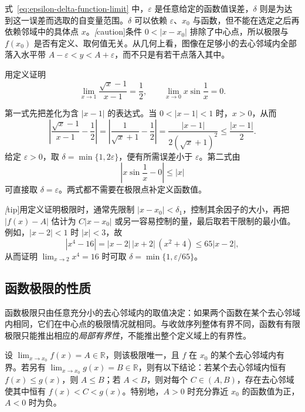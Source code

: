 \documentclass[UTF8,12pt,a4paper,fontset=fandol]{ctexbook}
\begin{document}
式~\eqref{eq:epsilon-delta-function-limit} 中，$\varepsilon$ 是任意给定的函数值误差，$\delta$ 则是为达到这一误差而选取的自变量范围。$\delta$ 可以依赖 $\varepsilon$、$x_0$ 与函数，但不能在选定之后再依赖邻域中的具体点 $x$。\emph[caution]{条件 $0<|x-x_0|$ 排除了中心点，所以极限与 $f(x_0)$ 是否有定义、取何值无关。}从几何上看，图像在足够小的去心邻域内全部落入水平带 $A-\varepsilon<y<A+\varepsilon$，而不只是有若干点落入其中。

\begin{example}
\label{ex:epsilon-delta-function-limits}
用定义证明
\[
    \lim_{x\to1}\frac{\sqrt{x}-1}{x-1}=\frac12,
    \qquad
    \lim_{x\to0}x\sin\frac1x=0.
\]
\end{example}

\begin{solve}
第一式先把差化为含 $|x-1|$ 的表达式。当 $0<|x-1|<1$ 时，$x>0$，从而
\[
    \left|\frac{\sqrt{x}-1}{x-1}-\frac12\right|
    =\left|\frac1{\sqrt{x}+1}-\frac12\right|
    =\frac{|x-1|}{2(\sqrt{x}+1)^2}
    \leq\frac{|x-1|}{2}.
\]
给定 $\varepsilon>0$，取 $\delta=\min\{1,2\varepsilon\}$，便有所需误差小于 $\varepsilon$。第二式由
\[
    \left|x\sin\frac1x-0\right|\leq|x|
\]
可直接取 $\delta=\varepsilon$。两式都不需要在极限点补定义函数值。
\end{solve}

\emph[tip]{用定义证明极限时，通常先限制 $|x-x_0|<\delta_1$，控制其余因子的大小，再把 $|f(x)-A|$ 估计为 $C|x-x_0|$ 或另一容易控制的量，最后取若干限制的最小值。}例如，$|x-2|<1$ 时 $|x|<3$，故
\[
    |x^4-16|=|x-2|\,|x+2|\,(x^2+4)\leq65|x-2|,
\]
从而证明 $\lim_{x\to2}x^4=16$ 时可取 $\delta=\min\{1,\varepsilon/65\}$。

\subsection{函数极限的性质}
\label{subsec:properties-of-function-limits}

函数极限只由任意充分小的去心邻域内的取值决定：如果两个函数在某个去心邻域内相同，它们在中心点的极限情况就相同。与收敛序列整体有界不同，函数有有限极限只能推出相应的\emph{局部有界性}，不能推出整个定义域上的有界性。

\begin{theorem}
\label{thm:local-properties-of-function-limits}
设 $\lim_{x\to x_0}f(x)=A\in\mathbb{R}$，则该极限唯一，且 $f$ 在 $x_0$ 的某个去心邻域内有界。若另有 $\lim_{x\to x_0}g(x)=B\in\mathbb{R}$，则有以下结论：若某个去心邻域内恒有 $f(x)\leq g(x)$，则 $A\leq B$；若 $A<B$，则对每个 $C\in(A,B)$，存在去心邻域使其中恒有 $f(x)<C<g(x)$。特别地，$A>0$ 时充分靠近 $x_0$ 的函数值为正，$A<0$ 时为负。
\end{theorem}
\end{document}
